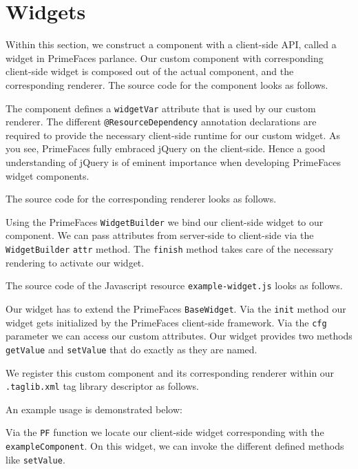 \section{Widgets}
Within this section, we construct a component with a client-side API, called a widget in PrimeFaces parlance.
Our custom component with corresponding client-side widget is composed out of the actual component, and the corresponding renderer.
The source code for the component looks as follows.

The component defines a \texttt{widgetVar} attribute that is used by our custom renderer.
The different \texttt{@ResourceDependency} annotation declarations are required to provide the necessary client-side runtime for our custom widget.
As you see, PrimeFaces fully embraced jQuery \cite{jQuery} on the client-side.
Hence a good understanding of jQuery is of eminent importance when developing PrimeFaces widget components.

The source code for the corresponding renderer looks as follows.

Using the PrimeFaces \texttt{WidgetBuilder} we bind our client-side widget to our component.
We can pass attributes from server-side to client-side via the \texttt{WidgetBuilder} \texttt{attr} method.
The \texttt{finish} method takes care of the necessary rendering to activate our widget.

The source code of the Javascript resource \texttt{example-widget.js} looks as follows.

Our widget has to extend the PrimeFaces \texttt{BaseWidget}.
Via the \texttt{init} method our widget gets initialized by the PrimeFaces client-side framework.
Via the \texttt{cfg} parameter we can access our custom attributes.
Our widget provides two methods \texttt{getValue} and \texttt{setValue} that do exactly as they are named.

We register this custom component and its corresponding renderer within our \texttt{.taglib.xml} tag library descriptor as follows.


An example usage is demonstrated below:

Via the \texttt{PF} function we locate our client-side widget corresponding with the \texttt{exampleComponent}.
On this widget, we can invoke the different defined methods like \texttt{setValue}.

